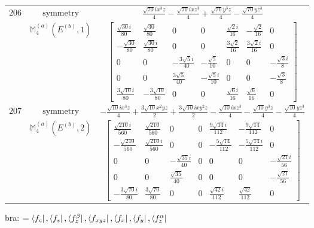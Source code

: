 \documentclass[fleqn,8pt,landscape]{jsarticle}
\begin{document}
\begin{longtable}{ccc}
$ 206 $ & $ \text{symmetry} $ & $ \frac{\sqrt{70} i x^{3} z}{4} - \frac{\sqrt{70} i x z^{3}}{4} + \frac{\sqrt{70} y^{3} z}{4} - \frac{\sqrt{70} y z^{3}}{4} $ \\
$  $ & $ \mathbb{M}_{4}^{(a)}(E^{(b)},1) $ & $ \begin{bmatrix} \frac{\sqrt{30} i}{80} & \frac{\sqrt{30}}{80} & 0 & 0 & \frac{\sqrt{2} i}{16} & - \frac{\sqrt{2}}{16} & 0 \\ - \frac{\sqrt{30}}{80} & \frac{\sqrt{30} i}{80} & 0 & 0 & \frac{3 \sqrt{2}}{16} & \frac{3 \sqrt{2} i}{16} & 0 \\ 0 & 0 & - \frac{3 \sqrt{5} i}{40} & - \frac{\sqrt{5}}{10} & 0 & 0 & - \frac{\sqrt{3} i}{8} \\ 0 & 0 & \frac{3 \sqrt{5}}{40} & - \frac{\sqrt{5} i}{10} & 0 & 0 & - \frac{\sqrt{3}}{8} \\ \frac{3 \sqrt{10} i}{80} & - \frac{3 \sqrt{10}}{80} & 0 & 0 & \frac{\sqrt{6} i}{16} & \frac{\sqrt{6}}{16} & 0 \end{bmatrix} $ \\ \hline
$ 207 $ & $ \text{symmetry} $ & $ - \frac{\sqrt{10} i x^{3} z}{4} + \frac{3 \sqrt{10} x^{2} y z}{2} + \frac{3 \sqrt{10} i x y^{2} z}{2} - \frac{\sqrt{10} i x z^{3}}{4} - \frac{\sqrt{10} y^{3} z}{4} - \frac{\sqrt{10} y z^{3}}{4} $ \\
$  $ & $ \mathbb{M}_{4}^{(a)}(E^{(b)},2) $ & $ \begin{bmatrix} \frac{\sqrt{210} i}{560} & \frac{\sqrt{210}}{560} & 0 & 0 & \frac{9 \sqrt{14} i}{112} & - \frac{9 \sqrt{14}}{112} & 0 \\ - \frac{\sqrt{210}}{560} & \frac{\sqrt{210} i}{560} & 0 & 0 & - \frac{5 \sqrt{14}}{112} & - \frac{5 \sqrt{14} i}{112} & 0 \\ 0 & 0 & - \frac{\sqrt{35} i}{40} & 0 & 0 & 0 & - \frac{\sqrt{21} i}{56} \\ 0 & 0 & \frac{\sqrt{35}}{40} & 0 & 0 & 0 & - \frac{\sqrt{21}}{56} \\ - \frac{3 \sqrt{70} i}{80} & \frac{3 \sqrt{70}}{80} & 0 & 0 & \frac{\sqrt{42} i}{112} & \frac{\sqrt{42}}{112} & 0 \end{bmatrix} $ \\ \hline
\end{longtable}
bra: $=\bra{f_{c}}, \bra{f_{s}}, \bra{f_{z}^{\beta}}, \bra{f_{xyz}}, \bra{f_{x}}, \bra{f_{y}}, \bra{f_{z}^{\alpha}}$
\end{document}
